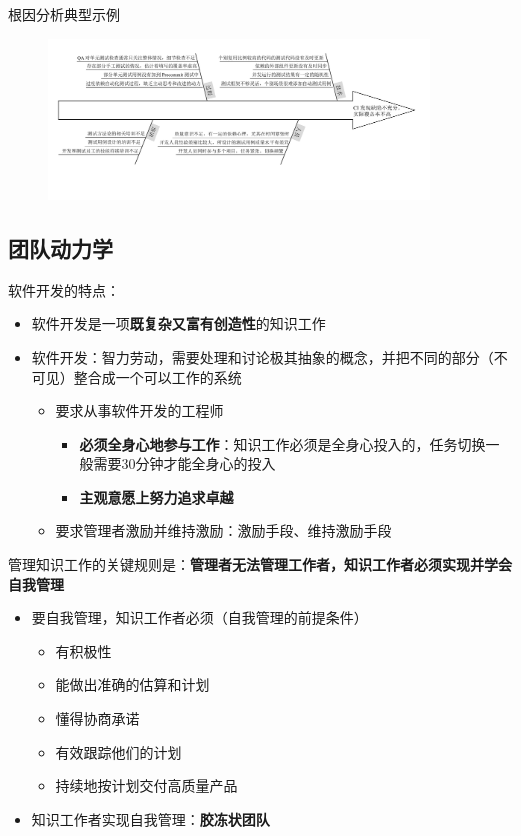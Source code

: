 根因分析典型示例
\begin{figure}[H]
    \vspace{-0.5em}
	\centering
	\includegraphics[width=0.9\textwidth]{images/根因分析典型示例.pdf}
    \vspace{-1em}
\end{figure}
\vspace{-1em}

\subsection{团队动力学}
软件开发的特点：
\begin{itemize}
    \item 软件开发是一项\textbf{既复杂又富有创造性}的知识工作
    \item 软件开发：智力劳动，需要处理和讨论极其抽象的概念，并把不同的部分（不可见）整合成一个可以工作的系统
    \begin{itemize}
        \item 要求从事软件开发的工程师
        \begin{itemize}
            \item \textbf{必须全身心地参与工作}：知识工作必须是全身心投入的，任务切换一般需要30分钟才能全身心的投入
            \item \textbf{主观意愿上努力追求卓越}
        \end{itemize}
        \item 要求管理者激励并维持激励：激励手段、维持激励手段
    \end{itemize}
\end{itemize}

管理知识工作的关键规则是：\textbf{管理者无法管理工作者，知识工作者必须实现并学会自我管理}
\begin{itemize}
    \item 要自我管理，知识工作者必须（自我管理的前提条件）
    \vspace{-0.8em}
    \begin{multicols}{3}
        \begin{itemize}
        \item 有积极性
        \item 能做出准确的估算和计划
        \item 懂得协商承诺
        \item 有效跟踪他们的计划
        \item 持续地按计划交付高质量产品
        \end{itemize}
    \end{multicols}
    \vspace{-1em}
    \item 知识工作者实现自我管理：\textbf{胶冻状团队}
\end{itemize}

